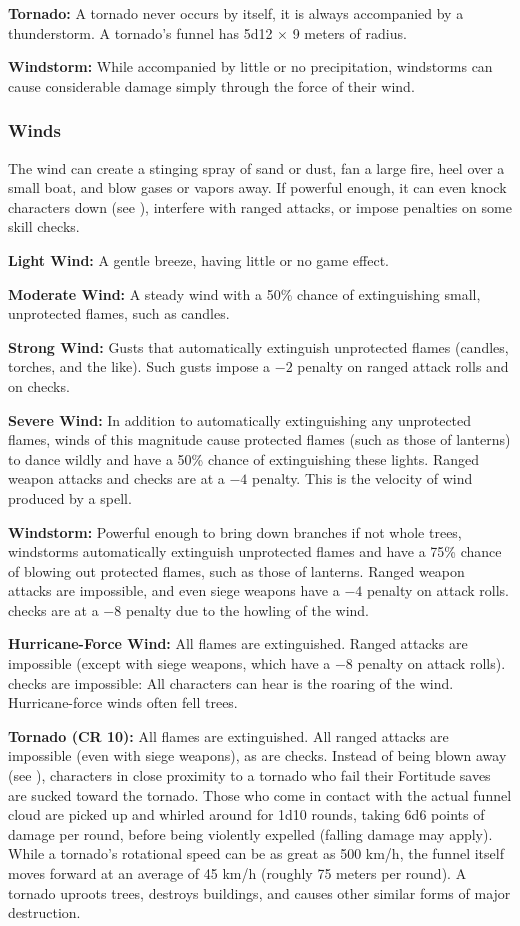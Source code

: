 \textbf{Tornado:} A tornado never occurs by itself, it is always accompanied by a thunderstorm. A tornado's funnel has 5d12 $\times$ 9 meters of radius.

\textbf{Windstorm:} While accompanied by little or no precipitation, windstorms can cause considerable damage simply through the force of their wind.

\subsubsection{Winds}
The wind can create a stinging spray of sand or dust, fan a large fire, heel over a small boat, and blow gases or vapors away. If powerful enough, it can even knock characters down (see ), interfere with ranged attacks, or impose penalties on some skill checks.

\textbf{Light Wind:} A gentle breeze, having little or no game effect.

\textbf{Moderate Wind:} A steady wind with a 50\% chance of extinguishing small, unprotected flames, such as candles.

\textbf{Strong Wind:} Gusts that automatically extinguish unprotected flames (candles, torches, and the like). Such gusts impose a $-2$ penalty on ranged attack rolls and on  checks.

\textbf{Severe Wind:} In addition to automatically extinguishing any unprotected flames, winds of this magnitude cause protected flames (such as those of lanterns) to dance wildly and have a 50\% chance of extinguishing these lights. Ranged weapon attacks and  checks are at a $-4$ penalty. This is the velocity of wind produced by a  spell.

\textbf{Windstorm:} Powerful enough to bring down branches if not whole trees, windstorms automatically extinguish unprotected flames and have a 75\% chance of blowing out protected flames, such as those of lanterns. Ranged weapon attacks are impossible, and even siege weapons have a $-4$ penalty on attack rolls.  checks are at a $-8$ penalty due to the howling of the wind.

\textbf{Hurricane-Force Wind:} All flames are extinguished. Ranged attacks are impossible (except with siege weapons, which have a $-8$ penalty on attack rolls).  checks are impossible: All characters can hear is the roaring of the wind. Hurricane-force winds often fell trees.

\textbf{Tornado (CR 10):} All flames are extinguished. All ranged attacks are impossible (even with siege weapons), as are  checks. Instead of being blown away (see ), characters in close proximity to a tornado who fail their Fortitude saves are sucked toward the tornado. Those who come in contact with the actual funnel cloud are picked up and whirled around for 1d10 rounds, taking 6d6 points of damage per round, before being violently expelled (falling damage may apply). While a tornado's rotational speed can be as great as 500 km/h, the funnel itself moves forward at an average of 45 km/h (roughly 75 meters per round). A tornado uproots trees, destroys buildings, and causes other similar forms of major destruction.

